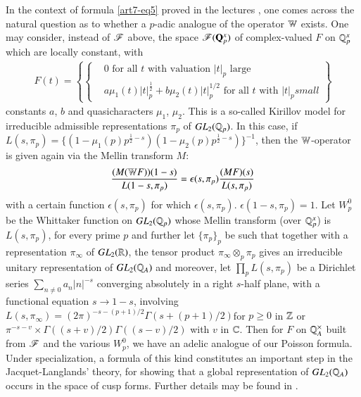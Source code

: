 In the context of formula \eqref{art7-eq5} proved in the lectures \cite{art7-I}, one comes across the natural question as to whether a $p$-adic analogue of the operator $\mathbb{W}$ exists. One may consider, instead of $\mathscr{F}$ above, the space $\mathscr{F} (\mathbf{Q}^x_p)$ of complex-valued $F$ on $\mathbb{Q}^x_p$ which are locally constant, with 
\begin{align*}
F(t) = 
\left\{ 
\begin{cases}
& \text{0 for all  $t$ with valuation $|t|_p$ large}\\
& a \mu_1 (t) |t|^{\frac{1}{2}}_p + b \mu_2 (t) |t|^{1/2}_p \text{ for all } t \text{ with } |t|_p small 
\end{cases}
\right\} \label{art7-eq8}
\end{align*}
constants $a$, $b$ and quasicharacters $\mu_1$, $\mu_2$. This is a so-called Kirillov model for irreducible admissible representations $\pi_p$ of $GL_2 (\mathbb{Q}_p)$. In this case, if $L(s, \pi_p) = \{(1-\mu_1 (p)p^{\frac{1}{2}-s}) (1-\mu_2 (p) p^{\frac{1}{2} -s})\}^{-1}$, then the $\mathbb{W}$-operator is given again via the Mellin transform $M$:
\begin{equation}
\frac{(M (\mathbb{W} F)) (1-s)}{L(1-s, \pi_p)} =\epsilon (s, \pi_p) \frac{(MF) (s)}{L(s, \pi_p)} \label{art7-eq9}
\end{equation}
with a certain function $\epsilon (s, \pi_p)$ for which $\epsilon (s, \pi_p)$. $\epsilon (1-s ,\pi_p) =1$. Let $W^0_p$ be the Whittaker function on $GL_2 (\mathbb{Q}_p)$ whose Mellin transform (over $\mathbb{Q}^x_p$) is $L(s, \pi_p)$, for every prime $p$ and further let $\{\pi_p\}_p$ be such that together with a representation $\pi_\infty$ of $GL_2 (\mathbb{R})$, the tensor product $\pi_\infty \otimes_p \pi_p$ gives an irreducible unitary representation of $GL_2 (\mathbb{Q}_A)$ and moreover, let $\prod\limits_p L (s, \pi_p)$ be a Dirichlet series $\sum\limits_{n \neq 0} a_n |n|^{-s}$ converging absolutely in a right $s$-half plane, with a functional equation $s \to 1 -s$, involving $L(s, \pi_\infty) = (2 \pi)^{-s-(p+1)/2} \Gamma (s+(p+1)/2)$\pageoriginale for $p \geqslant 0$ in $\mathbb{Z}$ or $\pi^{-s - v } \times \Gamma ((s+v)/2) \Gamma ((s-v)/2)$ with $v$ in $\mathbb{C}$. Then for $F$ on $\mathbb{Q}^\times_A$ built from $\mathscr{F}$ and the various $W^0_p$, we have an adelic analogue of our Poisson formula. Under specialization, a formula of this kind constitutes an important step in the Jacquet-Langlands' theory, for showing that a global representation of $GL_2 (\mathbb{Q}_A)$ occurs in the space of cusp forms. Further details may be found in \cite{art7-R-R}.

